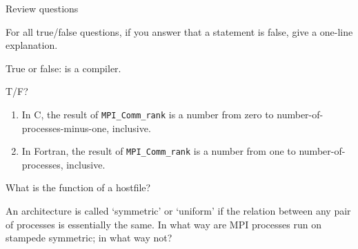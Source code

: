  {Review questions}

For all true/false questions, if you answer that a statement is false,
give a one-line explanation.

\begin{exercise}
  \label{ex:m1}
  True or false:  is a compiler.
\end{exercise}

\begin{exercise}
  \label{ex:mpi01rank}
  T/F?
  \begin{enumerate}
  \item In C, the result of \lstinline{MPI_Comm_rank} is a number
    from zero to number-of-processes-minus-one, inclusive.
  \item In Fortran, the result of \lstinline{MPI_Comm_rank} is a number
    from one to number-of-processes, inclusive.
  \end{enumerate}
\end{exercise}

\begin{exercise}
  What is the function of a hostfile?
\end{exercise}

\begin{pcse}
\begin{exercise}
    An architecture is called `symmetric' or `uniform' if the
    relation between any pair of processes is essentially the same.
    In what way are MPI processes run on stampede symmetric; in what way
    not?
\end{exercise}
\end{pcse}


